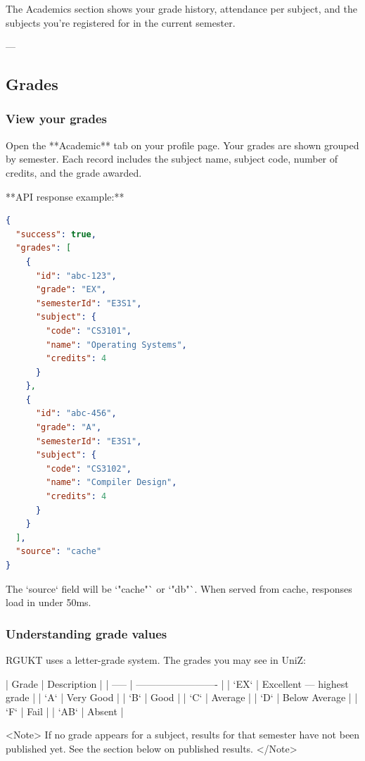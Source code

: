 


The Academics section shows your grade history, attendance per subject, and the subjects you're registered for in the current semester.

---

\subsection{Grades}

\subsubsection{View your grades}

Open the **Academic** tab on your profile page. Your grades are shown grouped by semester. Each record includes the subject name, subject code, number of credits, and the grade awarded.

**API response example:**

\begin{lstlisting}[language=json]
{
  "success": true,
  "grades": [
    {
      "id": "abc-123",
      "grade": "EX",
      "semesterId": "E3S1",
      "subject": {
        "code": "CS3101",
        "name": "Operating Systems",
        "credits": 4
      }
    },
    {
      "id": "abc-456",
      "grade": "A",
      "semesterId": "E3S1",
      "subject": {
        "code": "CS3102",
        "name": "Compiler Design",
        "credits": 4
      }
    }
  ],
  "source": "cache"
}

\end{lstlisting}

The `source` field will be `"cache"` or `"db"`. When served from cache, responses load in under 50ms.

\subsubsection{Understanding grade values}

RGUKT uses a letter-grade system. The grades you may see in UniZ:

| Grade | Description               |
| ----- | ------------------------- |
| `EX`  | Excellent — highest grade |
| `A`   | Very Good                 |
| `B`   | Good                      |
| `C`   | Average                   |
| `D`   | Below Average             |
| `F`   | Fail                      |
| `AB`  | Absent                    |

<Note>
  If no grade appears for a subject, results for that semester have not been
  published yet. See the section below on published results.
</Note>

